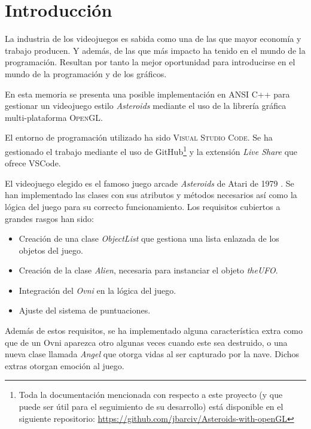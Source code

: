 \section{Introducción}
La industria de los videojuegos es sabida como una de las que mayor economía y trabajo producen. Y además, de las que más impacto ha tenido en el mundo de la programación. Resultan por tanto la mejor oportunidad para introducirse en el mundo de la programación y de los gráficos. 

En esta memoria se presenta una posible implementación en ANSI C++ para gestionar un videojuego estilo \emph{Asteroids} mediante el uso de la librería gráfica multi-plataforma \textsc{OpenGL}.

El entorno de programación utilizado ha sido \textsc{Visual Studio Code}. Se ha gestionado el trabajo mediante el uso de GitHub\footnote{Toda la documentación mencionada con respecto a este proyecto (y que puede ser útil para el seguimiento de su desarrollo) está disponible en el siguiente repositorio: \url{https://github.com/jbarciv/Asteroids-with-openGL}} y la extensión \emph{Live Share} que ofrece VSCode.

El videojuego elegido es el famoso juego arcade \emph{Asteroids} de Atari de 1979 \cite{wiki}. Se han implementado las clases con sus atributos y métodos necesarios así como la lógica del juego para su correcto funcionamiento.
Los requisitos cubiertos a grandes rasgos han sido:
\begin{itemize}
    \item Creación de una clase \emph{ObjectList} que gestiona una lista enlazada de los objetos del juego.
    \item Creación de la clase \emph{Alien}, necesaria para instanciar el objeto \emph{theUFO}.
    \item Integración del \emph{Ovni} en la lógica del juego.
    \item Ajuste del sistema de puntuaciones.
\end{itemize}

Además de estos requisitos, se ha implementado alguna característica extra como que de un Ovni aparezca otro algunas veces cuando este sea destruido, o una nueva clase llamada \emph{Angel} que otorga vidas al ser capturado por la nave. Dichos extras otorgan emoción al juego.

\clearpage